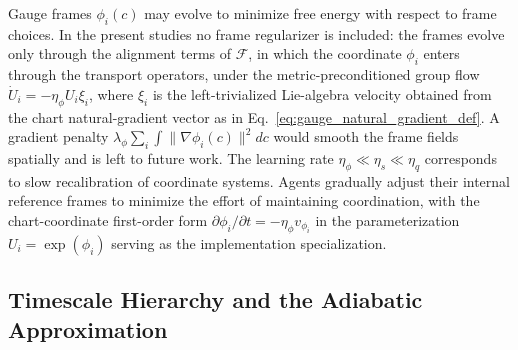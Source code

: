 \documentclass[11pt]{article}
\begin{document}
Gauge frames $\phi_i(c)$ may evolve to minimize free energy with respect to frame choices. In the present studies no frame regularizer is included: the frames evolve only through the alignment terms of $\mathcal{F}$, in which the coordinate $\phi_i$ enters through the transport operators, under the metric-preconditioned group flow $\dot U_i = -\eta_\phi U_i \xi_i$, where $\xi_i$ is the left-trivialized Lie-algebra velocity obtained from the chart natural-gradient vector as in Eq.~\eqref{eq:gauge_natural_gradient_def}. A gradient penalty $\lambda_\phi \sum_i \int \|\nabla \phi_i(c)\|^2  dc$ would smooth the frame fields spatially and is left to future work. The learning rate $\eta_\phi \ll \eta_s \ll \eta_q$ corresponds to slow recalibration of coordinate systems. Agents gradually adjust their internal reference frames to minimize the effort of maintaining coordination, with the chart-coordinate first-order form $\partial\phi_i/\partial t = -\eta_\phi v_{\phi_i}$ in the parameterization $U_i = \exp(\phi_i)$ serving as the implementation specialization.

\subsection{Timescale Hierarchy and the Adiabatic Approximation}
\label{sec:adiabatic_hierarchy}
\end{document}
